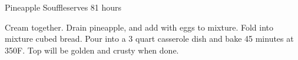 
\begin{recipe}{Pineapple Souffle}{serves 8}{1 hours}

  Cream together.
  Drain pineapple, and add with eggs to mixture.
  Fold into mixture cubed bread.  Pour into a 3 quart 
  casserole dish and bake 45 minutes at 350\0F.  Top will be golden and 
  crusty when done.
\end{recipe}